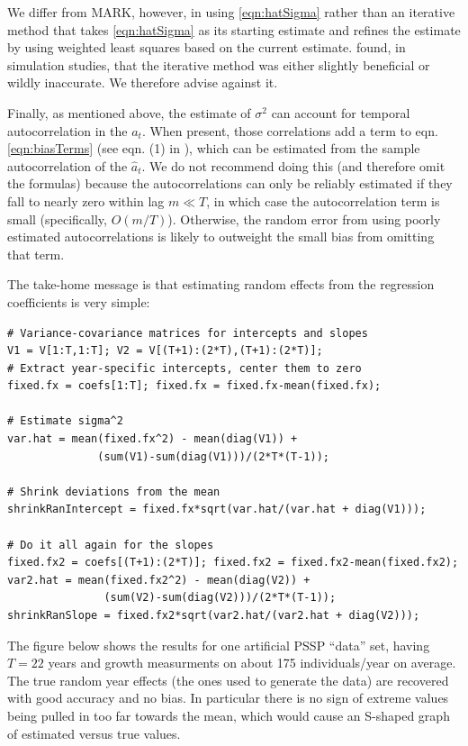 \documentclass[12pt]{article}
\begin{document}
We differ from MARK, however, in using \eqref{eqn:hatSigma} rather than an iterative method that takes \eqref{eqn:hatSigma} as its 
starting estimate and refines the estimate by using weighted least squares based on the current estimate. 
\citet{metcalf-etal-2015} found, in simulation studies, that the iterative method was either slightly beneficial 
or wildly inaccurate. We therefore advise against it. 

Finally, as mentioned above, the estimate of $\sigma^2$ can account for temporal autocorrelation in the $a_t$. 
When present, those correlations add a term to eqn. \eqref{eqn:biasTerms} (see eqn. (1) in \citet{gould-nichols-1998}), 
which can be estimated from the sample autocorrelation of the $\hat{a}_t$. We do not recommend doing this (and therefore omit
the formulas) because the autocorrelations can only be reliably estimated if they fall to nearly zero within lag $m \ll T$, in which
case the autocorrelation term is small (specifically, $O(m/T)$). Otherwise, the random error from using poorly estimated 
autocorrelations is likely to outweight the small bias from omitting that term. 

The take-home message is that estimating random effects from the regression coefficients is very simple: 
\begin{lstlisting}
# Variance-covariance matrices for intercepts and slopes
V1 = V[1:T,1:T]; V2 = V[(T+1):(2*T),(T+1):(2*T)]; 
# Extract year-specific intercepts, center them to zero   
fixed.fx = coefs[1:T]; fixed.fx = fixed.fx-mean(fixed.fx); 

# Estimate sigma^2
var.hat = mean(fixed.fx^2) - mean(diag(V1)) + 
              (sum(V1)-sum(diag(V1)))/(2*T*(T-1)); 

# Shrink deviations from the mean 
shrinkRanIntercept = fixed.fx*sqrt(var.hat/(var.hat + diag(V1)));

# Do it all again for the slopes 
fixed.fx2 = coefs[(T+1):(2*T)]; fixed.fx2 = fixed.fx2-mean(fixed.fx2); 
var2.hat = mean(fixed.fx2^2) - mean(diag(V2)) + 
               (sum(V2)-sum(diag(V2)))/(2*T*(T-1)); 
shrinkRanSlope = fixed.fx2*sqrt(var2.hat/(var2.hat + diag(V2))); 
\end{lstlisting}

The figure below shows the results for one artificial PSSP ``data'' set, having $T=22$ years and growth measurments on 
about 175 individuals/year on average. The true random year effects (the ones used to generate the data) are recovered
with good accuracy and no bias. In particular there is no sign of extreme values being pulled in too far
towards the mean, which would cause an S-shaped graph of estimated versus true values. 
\end{document}
